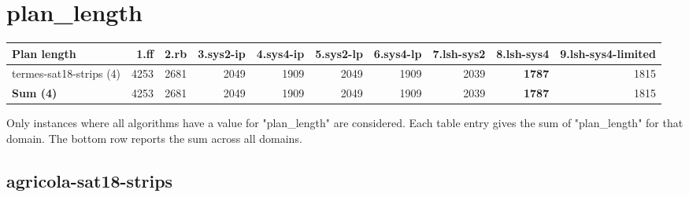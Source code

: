 \documentclass{article}
\newcommand{\numtasks}[1]{\small{(#1)}}
\begin{document}
\hypertarget{plan_length}{}
\section*{plan\_length}

\begin{tabular}{@{}lrrrrrrrrr@{}}
Plan length & 1.ff & 2.rb & 3.sys2-ip & 4.sys4-ip & 5.sys2-lp & 6.sys4-lp & 7.lsh-sys2 & 8.lsh-sys4 & 9.lsh-sys4-limited \\
\midrule
termes-sat18-strips \numtasks{4} & 4253 & 2681 & 2049 & 1909 & 2049 & 1909 & 2039 & \textbf{1787} & 1815 \\
\textbf{Sum \numtasks{4}} & 4253 & 2681 & 2049 & 1909 & 2049 & 1909 & 2039 & \textbf{1787} & 1815 \\
\end{tabular}

Only instances where all algorithms have a value for "plan\_length" are considered. Each table entry gives the sum of "plan\_length" for that domain. The bottom row reports the sum across all domains.

\hypertarget{plan_length-agricola-sat18-strips}{}
\subsection*{agricola-sat18-strips}
\end{document}
